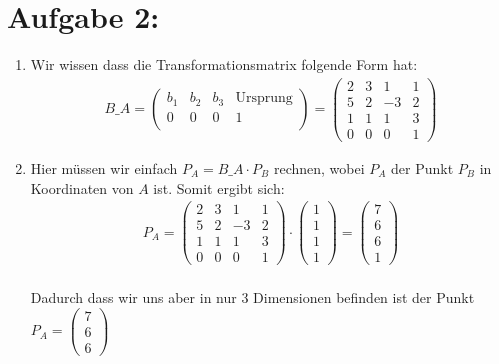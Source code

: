 \documentclass[11pt]{article}
\begin{document}
\section*{Aufgabe 2:}
\begin{enumerate}
  \item Wir wissen dass die Transformationsmatrix folgende Form hat:
        \begin{align*}
          B\_A = \begin{pmatrix*}
                   b_1 & b_2 & b_3 & \text{Ursprung} \\
                   0 & 0 & 0 & 1 \\
                 \end{pmatrix*} = \begin{pmatrix*}
                                    2 & 3 & 1 & 1 \\
                                    5 & 2 & -3 & 2 \\
                                    1 & 1 & 1 & 3 \\
                                    0 & 0 & 0 & 1
                                  \end{pmatrix*}
        \end{align*}
  \item Hier müssen wir einfach $P_A = B\_A \cdot P_B$ rechnen, wobei $P_A$ der Punkt $P_B$ in Koordinaten von $A$ ist. Somit ergibt sich:
        \begin{align*}
          P_A = \begin{pmatrix*}
                  2 & 3 & 1 & 1 \\
                  5 & 2 & -3 & 2 \\
                  1 & 1 & 1 & 3 \\
                  0 & 0 & 0 & 1
                \end{pmatrix*} \cdot \begin{pmatrix*}
                                       1 \\
                                       1 \\
                                       1 \\
                                       1
                                     \end{pmatrix*} = \begin{pmatrix*}
                                                        7 \\
                                                        6 \\
                                                        6 \\
                                                        1
                                                      \end{pmatrix*}
        \end{align*} \\
        Dadurch dass wir uns aber in nur 3 Dimensionen befinden ist der Punkt $P_A = \begin{pmatrix*}
            7 \\
            6 \\
            6
          \end{pmatrix*}$
\end{enumerate}
\end{document}
